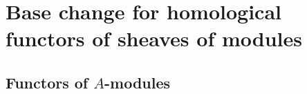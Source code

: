 \section{Base change for homological functors of sheaves of modules}
\label{section:3.7}


\subsection{Functors of $A$-modules}
\label{subsection:3.7.1}
















